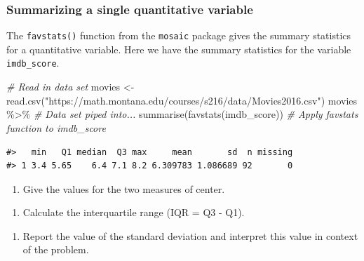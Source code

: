 \documentclass[
]{report}
\newenvironment{Shaded}{\begin{snugshade}}{\end{snugshade}}
\newcommand{\CommentTok}[1]{\textcolor[rgb]{0.56,0.35,0.01}{\textit{#1}}}
\newcommand{\FunctionTok}[1]{\textcolor[rgb]{0.00,0.00,0.00}{#1}}
\newcommand{\NormalTok}[1]{#1}
\newcommand{\OtherTok}[1]{\textcolor[rgb]{0.56,0.35,0.01}{#1}}
\newcommand{\SpecialCharTok}[1]{\textcolor[rgb]{0.00,0.00,0.00}{#1}}
\newcommand{\StringTok}[1]{\textcolor[rgb]{0.31,0.60,0.02}{#1}}
\providecommand{\tightlist}{%
  \setlength{\itemsep}{0pt}\setlength{\parskip}{0pt}}
\begin{document}
\vspace{.5in}

\hypertarget{summarizing-a-single-quantitative-variable}{%
\subsubsection*{Summarizing a single quantitative variable}\label{summarizing-a-single-quantitative-variable}}

The \texttt{favstats()} function from the \texttt{mosaic} package gives the summary statistics for a quantitative variable. Here we have the summary statistics for the variable \texttt{imdb\_score}.

\begin{Shaded}
\begin{Highlighting}[]
\CommentTok{\# Read in data set}
\NormalTok{movies }\OtherTok{\textless{}{-}} \FunctionTok{read.csv}\NormalTok{(}\StringTok{"https://math.montana.edu/courses/s216/data/Movies2016.csv"}\NormalTok{) }
\NormalTok{movies }\SpecialCharTok{\%\textgreater{}\%} \CommentTok{\# Data set piped into...}
  \FunctionTok{summarise}\NormalTok{(}\FunctionTok{favstats}\NormalTok{(imdb\_score)) }\CommentTok{\# Apply favstats function to imdb\_score}
\end{Highlighting}
\end{Shaded}

\begin{verbatim}
#>   min   Q1 median  Q3 max     mean       sd  n missing
#> 1 3.4 5.65    6.4 7.1 8.2 6.309783 1.086689 92       0
\end{verbatim}

\begin{enumerate}
\def\labelenumi{\arabic{enumi}.}
\setcounter{enumi}{3}
\tightlist
\item
  Give the values for the two measures of center.
\end{enumerate}

\vspace{0.5in}

\begin{enumerate}
\def\labelenumi{\arabic{enumi}.}
\setcounter{enumi}{4}
\tightlist
\item
  Calculate the interquartile range (IQR = Q3 - Q1).
\end{enumerate}

\vspace{0.5in}

\begin{enumerate}
\def\labelenumi{\arabic{enumi}.}
\setcounter{enumi}{5}
\tightlist
\item
  Report the value of the standard deviation and interpret this value in context of the problem.
  \vspace{1in}
\end{enumerate}
\end{document}
